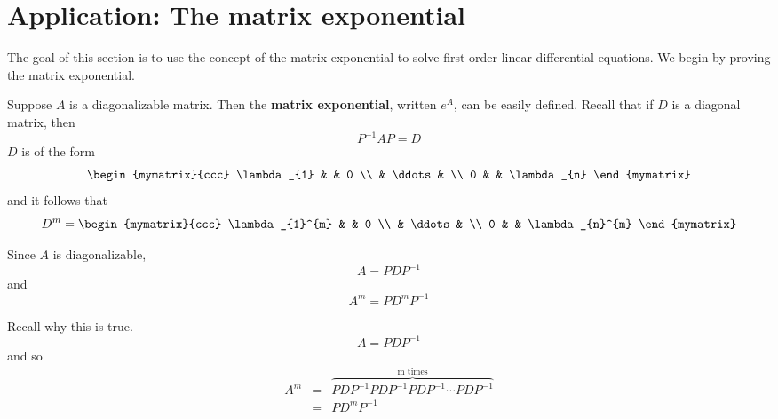 \section{Application: The matrix exponential}

The goal of this section is to use the concept of the matrix exponential to solve first order linear differential equations. We begin by proving the matrix exponential. 

Suppose $A$ is a diagonalizable matrix. Then the {\bf matrix exponential}, written $e^{A}$, can be easily defined. 
Recall that if $D$ is a diagonal matrix, then  
\begin{equation*}
P^{-1}AP=D
\end{equation*}
$D$ is of the form 
\begin{equation}
\begin{mymatrix}{ccc}
\lambda _{1} &  & 0 \\ 
& \ddots &  \\ 
0 &  & \lambda _{n}
\end{mymatrix}  \label{diagonal-matrix}
\end{equation}
and it follows that 
\begin{equation*}
D^{m}=\begin{mymatrix}{ccc}
\lambda _{1}^{m} &  & 0 \\ 
& \ddots &  \\ 
0 &  & \lambda _{n}^{m}
\end{mymatrix}
\end{equation*}

Since $A$ is diagonalizable, 
\begin{equation*}
A=PDP^{-1}
\end{equation*}
and
\begin{equation*}
A^{m}=PD^{m}P^{-1}
\end{equation*}

Recall why this is true. 
\begin{equation*}
A=PDP^{-1}
\end{equation*}
and so 
\begin{eqnarray*}
A^{m} &=&\overset{
\text{m times}}{\overbrace{PDP^{-1}PDP^{-1}PDP^{-1}\cdots PDP^{-1}}} \\
&=&PD^{m}P^{-1}
\end{eqnarray*}

